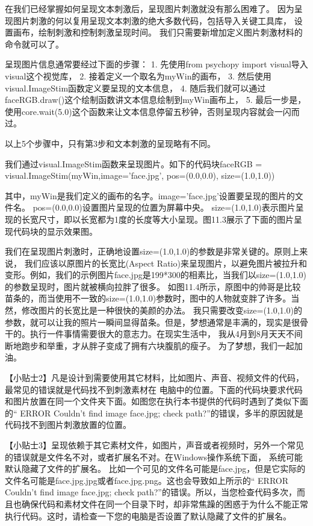 \documentclass[11pt]{article}
\begin{document}
在我们已经掌握如何呈现文本刺激后，呈现图片刺激就没有那么困难了。
因为呈现图片刺激的何以复用呈现文本刺激的绝大多数代码，包括导入关键工具库，
设置画布，绘制刺激和控制刺激呈现时间。
我们只需要新增加定义图片刺激材料的命令就可以了。

呈现图片信息通常要经过下面的步骤： 1. 先使用from psychopy import
visual导入visual这个视觉库， 2. 接着定义一个取名为myWin的画布， 3.
然后使用visual.ImageStim函数定义要呈现的文本信息， 4.
随后我们就可以通过faceRGB.draw()这个绘制函数讲文本信息绘制到myWin画布上，
5.
最后一步是，使用core.wait(5.0)这个函数来让文本信息停留五秒钟，否则呈现内容就会一闪而过。

以上5个步骤中，只有第3步和文本刺激的呈现略有不同。

我们通过visual.ImageStim函数来呈现图片。如下的代码块faceRGB =
visual.ImageStim(myWin,image='face.jpg', pos=(0.0,0.0), size=(1.0,1.0))

其中，myWin是我们定义的画布的名字。image='face.jpg'设置要呈现的图片的文件名。
pos=(0.0,0.0)设置图片呈现的位置为屏幕中央。
size=(1.0,1.0)表示图片呈现的长宽尺寸，即以长宽都为1度的长度等大小呈现。图11.3展示了下面的图片呈现代码块的显示效果图。

我们在呈现图片刺激时，正确地设置size=(1.0,1.0)的参数是非常关键的。原则上来说，
我们应该以原图片的长宽比(Aspect
Ratio)来呈现图片，以避免图片被拉升和变形。例如，我们的示例图片face.jpg是199*300的相素比，当我们以size=(1.0,1.0)的参数呈现时，图片就被横向拉胖了很多。
如图11.4所示，原图中的帅哥是比较苗条的，而当使用不一致的size=(1.0,1.0)参数时，图中的人物就变胖了许多。当然，修改图片的长宽比是一种很快的美颜的办法。
我只需要改变size=(1.0,1.0)的参数，就可以让我的照片一瞬间显得苗条。但是，梦想通常是丰满的，现实是很骨干的。执行一件事情需要很大的意志力。在现实生活中，
我从4月到8月天天不间断地跑步和举重，才从胖子变成了拥有六块腹肌的瘦子。
为了梦想，我们一起加油。

    【小贴士2】凡是设计到需要使用其它材料，比如图片、声音、视频文件的代码，最常见的错误就是代码找不到刺激素材在
电脑中的位置。下面的代码块要求代码和图片放置在同一个文件夹下面。如图您在执行本书提供的代码时遇到了类似下面的``
ERROR Couldn't find image face.jpg; check
path?''的错误，多半的原因就是代码找不到图片刺激放置的位置。



【小贴士3】呈现依赖于其它素材文件，如图片，声音或者视频时，另外一个常见的错误就是文件名不对，或者扩展名不对。在Windows操作系统下面，
系统可能默认隐藏了文件的扩展名。
比如一个可见的文件名可能是face.jpg，但是它实际的文件名可能是face.jpg.jpg或者face.jpg.png。这也会导致如上所示的``
ERROR Couldn't find image face.jpg; check
path?''的错误。所以，当您检查代码多次，而且也确保代码和素材文件在同一个目录下时，却非常焦躁的困惑于为什么不能正常执行代码。这时，请检查一下您的电脑是否设置了默认隐藏了文件的扩展名。
\end{document}

